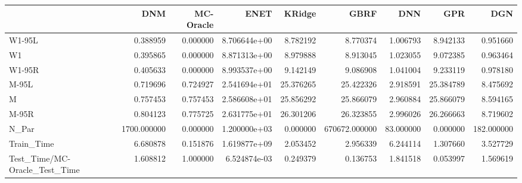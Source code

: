 \begin{tabular}{lrrrrrrrr}
\toprule
{} &          DNM &  MC-Oracle &          ENET &     KRidge &           GBRF &        DNN &        GPR &         DGN \\
\midrule
W1-95L                        &     0.388959 &   0.000000 &  8.706644e+00 &   8.782192 &       8.770374 &   1.006793 &   8.942133 &    0.951660 \\
W1                            &     0.395865 &   0.000000 &  8.871313e+00 &   8.979888 &       8.913045 &   1.023055 &   9.072385 &    0.963464 \\
W1-95R                        &     0.405633 &   0.000000 &  8.993537e+00 &   9.142149 &       9.086908 &   1.041004 &   9.233119 &    0.978180 \\
M-95L                         &     0.719696 &   0.724927 &  2.541694e+01 &  25.376265 &      25.422326 &   2.918591 &  25.384789 &    8.475692 \\
M                             &     0.757453 &   0.757453 &  2.586608e+01 &  25.856292 &      25.866079 &   2.960884 &  25.866079 &    8.594165 \\
M-95R                         &     0.804123 &   0.775725 &  2.631775e+01 &  26.301206 &      26.323855 &   2.996026 &  26.266663 &    8.719602 \\
N\_Par                         &  1700.000000 &   0.000000 &  1.200000e+03 &   0.000000 &  670672.000000 &  83.000000 &   0.000000 &  182.000000 \\
Train\_Time                    &     6.680878 &   0.151876 &  1.619877e+09 &   2.053452 &       2.956339 &   6.244114 &   1.307660 &    3.527729 \\
Test\_Time/MC-Oracle\_Test\_Time &     1.608812 &   1.000000 &  6.524874e-03 &   0.249379 &       0.136753 &   1.841518 &   0.053997 &    1.569619 \\
\bottomrule
\end{tabular}

